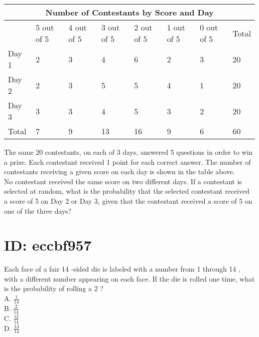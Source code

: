 

\begin{center}
\begin{tabular}{|l|l|l|l|l|l|l|l|}
\hline
\multicolumn{8}{|c|}{Number of Contestants by Score and Day} \\
\hline
 & 5 out of 5 & 4 out of 5 & 3 out of 5 & 2 out of 5 & 1 out of 5 & 0 out of 5 & Total \\
\hline
Day 1 & 2 & 3 & 4 & 6 & 2 & 3 & 20 \\
\hline
Day 2 & 2 & 3 & 5 & 5 & 4 & 1 & 20 \\
\hline
Day 3 & 3 & 3 & 4 & 5 & 3 & 2 & 20 \\
\hline
Total & 7 & 9 & 13 & 16 & 9 & 6 & 60 \\
\hline
\end{tabular}
\end{center}

The same 20 contestants, on each of 3 days, answered 5 questions in order to win a prize. Each contestant received 1 point for each correct answer. The number of contestants receiving a given score on each day is shown in the table above.\\
No contestant received the same score on two different days. If a contestant is selected at random, what is the probability that the selected contestant received a score of 5 on Day 2 or Day 3, given that the contestant received a score of 5 on one of the three days?

\section*{ID: eccbf957}
Each face of a fair 14 -sided die is labeled with a number from 1 through 14 , with a different number appearing on each face. If the die is rolled one time, what is the probability of rolling a 2 ?\\
A. $\frac{1}{14}$\\
B. $\frac{2}{14}$\\
C. $\frac{12}{14}$\\
D. $\frac{13}{14}$

